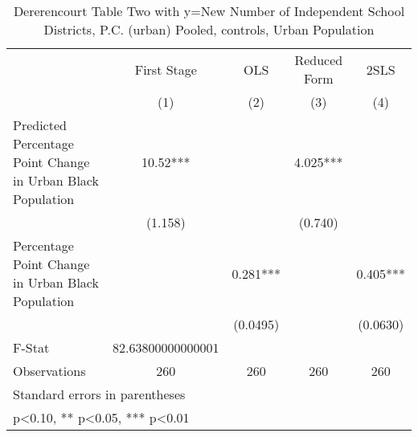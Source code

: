 \begin{table}[htbp]\centering
\def\sym#1{\ifmmode^{#1}\else\(^{#1}\)\fi}
\caption{Dererencourt Table Two with y=New Number of Independent School Districts, P.C. (urban)  Pooled,  controls, Urban Population}
\begin{tabular}{l*{4}{c}}
\toprule
                    & First Stage   &         OLS   &Reduced Form   &        2SLS   \\
                    &\multicolumn{1}{c}{(1)}   &\multicolumn{1}{c}{(2)}   &\multicolumn{1}{c}{(3)}   &\multicolumn{1}{c}{(4)}   \\
\midrule
Predicted Percentage Point Change in Urban Black Population&       10.52***&               &       4.025***&               \\
                    &     (1.158)   &               &     (0.740)   &               \\
\addlinespace
Percentage Point Change in Urban Black Population&               &       0.281***&               &       0.405***\\
                    &               &    (0.0495)   &               &    (0.0630)   \\
\midrule
F-Stat              &82.63800000000001   &               &               &               \\
Observations        &         260   &         260   &         260   &         260   \\
\bottomrule
\multicolumn{5}{l}{\footnotesize Standard errors in parentheses}\\
\multicolumn{5}{l}{\footnotesize * p<0.10, ** p<0.05, *** p<0.01}\\
\end{tabular}
\end{table}
